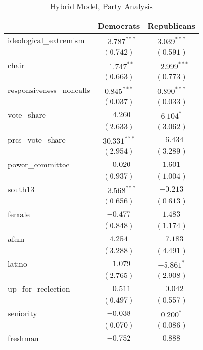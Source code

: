 \documentclass[12pt]{article}
\begin{document}
\begin{table}
	\begin{center}
		\caption{Hybrid Model, Party Analysis}
		\begin{tabular}{l c c }
			\hline
			& Democrats & Republicans \\
			\hline
			ideological\_extremism   & $-3.787^{***}$ & $3.039^{***}$  \\
			& $(0.742)$      & $(0.591)$      \\
			chair                    & $-1.747^{**}$  & $-2.999^{***}$ \\
			& $(0.663)$      & $(0.773)$      \\
			responsiveness\_noncalls & $0.845^{***}$  & $0.890^{***}$  \\
			& $(0.037)$      & $(0.033)$      \\
			vote\_share              & $-4.260$       & $6.104^{*}$    \\
			& $(2.633)$      & $(3.062)$      \\
			pres\_vote\_share        & $30.331^{***}$ & $-6.434$       \\
			& $(2.954)$      & $(3.289)$      \\
			power\_committee         & $-0.020$       & $1.601$        \\
			& $(0.937)$      & $(1.004)$      \\
			south13                  & $-3.568^{***}$ & $-0.213$       \\
			& $(0.656)$      & $(0.613)$      \\
			female                   & $-0.477$       & $1.483$        \\
			& $(0.848)$      & $(1.174)$      \\
			afam                     & $4.254$        & $-7.183$       \\
			& $(3.288)$      & $(4.491)$      \\
			latino                   & $-1.079$       & $-5.861^{*}$   \\
			& $(2.765)$      & $(2.908)$      \\
			up\_for\_reelection      & $-0.511$       & $-0.042$       \\
			& $(0.497)$      & $(0.557)$      \\
			seniority                & $-0.038$       & $0.200^{*}$    \\
			& $(0.070)$      & $(0.086)$      \\
			freshman                 & $-0.752$       & $0.888$        \\

\end{tabular}
\end{center}
\end{table}
\end{document}
